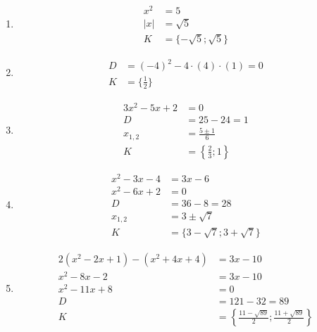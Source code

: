\documentclass[11pt,a4paper]{article}
\begin{document}
\begin{zadaniReseniBox}[title={Domácí úkol}]
\begin{enumerate}[label=\alph*),itemsep=2pt]
\[\begin{aligned}
D&=16-4\cdot(5)\cdot(3)=-44\\[2pt]
D&<0\ \Rightarrow\ \text{žádný reálný kořen}\\[2pt]
K&=\varnothing
\end{aligned}\]
\item
\[\begin{aligned}
x^2&=5\\|x|&=\sqrt{5}\\[2pt]
K&=\{- \sqrt{5};\sqrt{5}\}
\end{aligned}\]
\item \[ \begin{aligned}D&=(-4)^2-4\cdot(4)\cdot(1)=0\\K&=\{\frac{1}{2}\}\end{aligned}\]

\item \[\begin{aligned}3x^2-5x+2&=0\\D&=25-24=1\\x_{1,2}&=\frac{5\pm1}{6}\\K&=\left\{\frac23;1\right\}\end{aligned}\]
\item \[\begin{aligned}x^2-3x-4&=3x-6\\x^2-6x+2&=0\\D&=36-8=28\\x_{1,2}&=3\pm\sqrt7\\K&=\{3-\sqrt7;3+\sqrt7\}\end{aligned}\]
\item \[\begin{aligned}2(x^2-2x+1)-(x^2+4x+4)&=3x-10\\x^2-8x-2&=3x-10\\x^2-11x+8&=0\\D&=121-32=89\\K&=\left\{\frac{11-\sqrt{89}}2;\frac{11+\sqrt{89}}2\right\}\end{aligned}\]
\end{enumerate}
\end{zadaniReseniBox}
\end{document}

